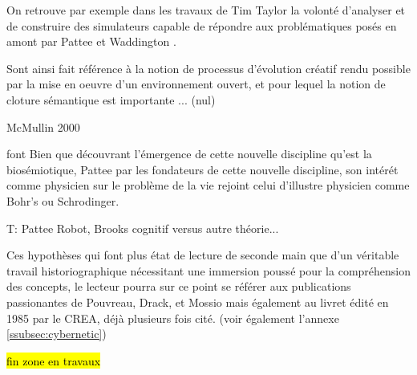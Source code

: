 On retrouve par exemple dans les travaux de Tim Taylor la volonté d'analyser et de construire des simulateurs capable de répondre aux  problématiques posés en amont par Pattee et Waddington \autocite{Taylor1999}.

Sont ainsi fait référence à la notion de processus d'évolution créatif rendu possible par la mise en oeuvre d'un environnement ouvert, et pour lequel la notion de cloture sémantique est importante ... (nul)

McMullin 2000

 font Bien que découvrant l'émergence de cette nouvelle discipline qu'est la biosémiotique, Pattee par les fondateurs de cette nouvelle discipline, son intérét comme physicien sur le problème de la vie rejoint celui d'illustre physicien comme Bohr's ou Schrodinger.

T: Pattee Robot, Brooks cognitif versus autre théorie...




Ces hypothèses qui font plus état de lecture de seconde main que d'un véritable travail historiographique nécessitant une immersion poussé pour la compréhension des concepts, le lecteur pourra sur ce point se référer aux publications passionantes de Pouvreau, Drack, et Mossio \autocites{Pouvreau2006, Pouvreau2013, Drack2015} mais également au livret édité en 1985 par le CREA, déjà plusieurs fois cité. (voir également l'annexe \ref{ssubsec:cybernetic})


\hl{fin zone en travaux}




